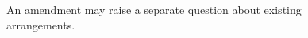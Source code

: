 \begin{figure}[H]
\centering
{}
\caption{An amendment may raise a separate question about existing arrangements.}\label{fig:teach-M10-05}
\end{figure}
